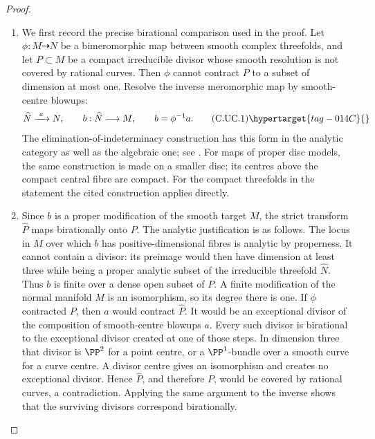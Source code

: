 \begin{proof}

\begin{enumerate}[label=\arabic*.,leftmargin=*]
\item We first record the precise birational comparison
used in the proof. Let $\phi:M\dashrightarrow N$
be a bimeromorphic map between smooth complex
threefolds, and let $P\subset M$ be a compact
irreducible divisor whose smooth resolution is
not covered by rational curves. Then $\phi$
cannot contract $P$ to a subset of dimension
at most one. Resolve the inverse meromorphic
map by smooth-centre blowups:
\[
 \widehat N\xrightarrow{\ a\ }N,
 \qquad b:\widehat N\longrightarrow M,
 \qquad b=\phi^{-1}a.
\tag{C.UC.1}\hypertarget{tag-014C}{}\label{cdp:eq:C.UC.1}
\]
The elimination-of-indeterminacy construction
has this form in the analytic category as
well as the algebraic one; see
\cite[Section~1.2.4 and Lemma~1.3.1]{AKMW2002}.
For maps of proper disc models, the same
construction is made on a smaller disc; its
centres above the compact central fibre are
compact. For the compact threefolds in the
statement the cited construction applies
directly.

\item Since $b$ is a proper modification of the
smooth target $M$, the strict transform
$\widehat P$ maps birationally onto $P$.
The analytic justification is as follows. The locus in
$M$ over which $b$ has positive-dimensional
fibres is analytic by properness. It cannot
contain a divisor: its preimage would then
have dimension at least three while being
a proper analytic subset of the irreducible
threefold $\widehat N$. Thus $b$ is finite
over a dense open subset of $P$. A finite
modification of the normal manifold $M$
is an isomorphism, so its degree there is
one. If $\phi$ contracted
$P$, then $a$ would contract $\widehat P$.
It would be an exceptional divisor of the
composition of smooth-centre blowups $a$.
Every such divisor is birational to the
exceptional divisor created at one of those
steps. In dimension three that divisor is
$\PP^2$ for a point centre, or a
$\PP^1$-bundle over a smooth curve for a
curve centre. A divisor centre gives an
isomorphism and creates no exceptional
divisor. Hence $\widehat P$, and therefore
$P$, would be covered by rational curves,
a contradiction. Applying the same argument
to the inverse shows that the surviving
divisors correspond birationally.


\end{enumerate}
\end{proof}
